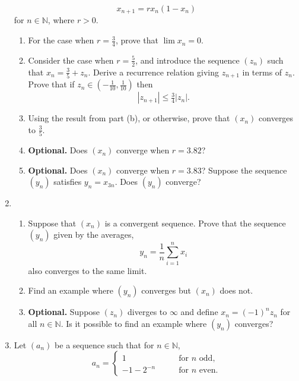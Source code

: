 \documentclass[12pt]{article}
\newcommand{\N}{\mathbb{N}}
\begin{document}
\begin{enumerate}
\begin{equation}
      x_{n+1}=rx_n(1-x_n)
    \end{equation}
    for $n\in \N$, where $r>0$.
    \begin{enumerate}
      \item For the case when $r=\tfrac34$, prove that $\lim x_n =0$.
      \item Consider the case when $r=\tfrac52$, and introduce the sequence
        $(z_n)$ such that $x_n = \tfrac35 + z_n$. Derive a recurrence relation
        giving $z_{n+1}$ in terms of $z_n$. Prove that if $z_n \in
        (-\tfrac1{10},\tfrac1{10})$ then
        \begin{equation}
          |z_{n+1}| \le \tfrac34 |z_n|.
        \end{equation}
      \item Using the result from part (b), or otherwise, prove that $(x_n)$
        converges to $\tfrac35$.
      \item \textbf{Optional.} Does $(x_n)$ converge when $r=3.82$?
      \item \textbf{Optional.} Does $(x_n)$ converge when $r=3.83$? Suppose the
        sequence $(y_n)$ satisfies $y_n=x_{3n}$. Does $(y_n)$ converge?
    \end{enumerate}
  \item
    \begin{enumerate}
      \item Suppose that $(x_n)$ is a convergent sequence. Prove that the
        sequence $(y_n)$ given by the averages,
        \begin{equation}
          y_n=\frac{1}{n} \sum_{i=1}^n x_i
        \end{equation}
        also converges to the same limit.
      \item Find an example where $(y_n)$ converges but $(x_n)$ does not.
      \item \textbf{Optional.} Suppose $(z_n)$ diverges to $\infty$ and define
        $x_n=(-1)^n z_n$ for all $n\in \N$. Is it possible to find an example
        where $(y_n)$ converges?
    \end{enumerate}
  \item Let $(a_n)$ be a sequence such that for $n\in \N$,
    \begin{equation}
      a_n = \begin{cases}
        1& \qquad \text{for $n$ odd,} \\
        -1-2^{-n} & \qquad \text{for $n$ even.}
      \end{cases}
    \end{equation}

\end{enumerate}
\end{document}
